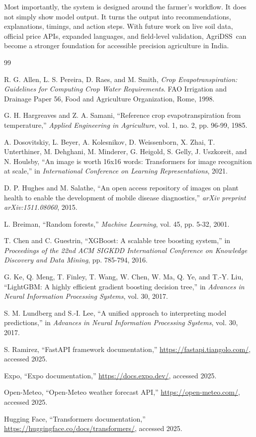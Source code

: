 \documentclass[12pt,a4paper]{report}
\newcommand{\SystemName}{AgriDSS}
\begin{document}
Most importantly, the system is designed around the farmer's workflow. It does not simply show model output. It turns the output into recommendations, explanations, timings, and action steps. With future work on live soil data, official price APIs, expanded languages, and field-level validation, \SystemName\ can become a stronger foundation for accessible precision agriculture in India.

\singlespacing

\renewcommand\bibname{References}
\begin{thebibliography}{99}
\singlespacing

R. G. Allen, L. S. Pereira, D. Raes, and M. Smith, \emph{Crop Evapotranspiration: Guidelines for Computing Crop Water Requirements}. FAO Irrigation and Drainage Paper 56, Food and Agriculture Organization, Rome, 1998.

G. H. Hargreaves and Z. A. Samani, ``Reference crop evapotranspiration from temperature,'' \emph{Applied Engineering in Agriculture}, vol. 1, no. 2, pp. 96-99, 1985.

A. Dosovitskiy, L. Beyer, A. Kolesnikov, D. Weissenborn, X. Zhai, T. Unterthiner, M. Dehghani, M. Minderer, G. Heigold, S. Gelly, J. Uszkoreit, and N. Houlsby, ``An image is worth 16x16 words: Transformers for image recognition at scale,'' in \emph{International Conference on Learning Representations}, 2021.

D. P. Hughes and M. Salathe, ``An open access repository of images on plant health to enable the development of mobile disease diagnostics,'' \emph{arXiv preprint arXiv:1511.08060}, 2015.

L. Breiman, ``Random forests,'' \emph{Machine Learning}, vol. 45, pp. 5-32, 2001.

T. Chen and C. Guestrin, ``XGBoost: A scalable tree boosting system,'' in \emph{Proceedings of the 22nd ACM SIGKDD International Conference on Knowledge Discovery and Data Mining}, pp. 785-794, 2016.

G. Ke, Q. Meng, T. Finley, T. Wang, W. Chen, W. Ma, Q. Ye, and T.-Y. Liu, ``LightGBM: A highly efficient gradient boosting decision tree,'' in \emph{Advances in Neural Information Processing Systems}, vol. 30, 2017.

S. M. Lundberg and S.-I. Lee, ``A unified approach to interpreting model predictions,'' in \emph{Advances in Neural Information Processing Systems}, vol. 30, 2017.

S. Ramirez, ``FastAPI framework documentation,'' \url{https://fastapi.tiangolo.com/}, accessed 2025.

Expo, ``Expo documentation,'' \url{https://docs.expo.dev/}, accessed 2025.

Open-Meteo, ``Open-Meteo weather forecast API,'' \url{https://open-meteo.com/}, accessed 2025.

Hugging Face, ``Transformers documentation,'' \url{https://huggingface.co/docs/transformers/}, accessed 2025.

\end{thebibliography}
\end{document}
